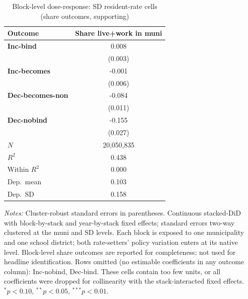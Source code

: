 \begin{table}[!htbp]
  \centering
  \caption{Block-level dose-response: SD resident-rate cells (share outcomes, supporting)}
  \label{tab:headline_block_sd_shares}
  \footnotesize
  \renewcommand{\arraystretch}{0.9}
  \begin{tabular}{lc}
    \toprule
    Outcome & Share live+work in muni \\
    \midrule
    \textbf{Inc-bind} & 0.008\sym{***} \\
                      & (0.003) \\
    \textbf{Inc-becomes} & -0.001 \\
                      & (0.006) \\
    \textbf{Dec-becomes-non} & -0.084\sym{***} \\
                      & (0.011) \\
    \textbf{Dec-nobind} & -0.155\sym{***} \\
                      & (0.027) \\
    \midrule
    $N$ & 20,050,835 \\
    $R^2$ & 0.438 \\
    Within $R^2$ & 0.000 \\
    Dep.\ mean & 0.103 \\
    Dep.\ SD & 0.158 \\
    \bottomrule
  \end{tabular}
  \vspace{0.3em}
  \begin{minipage}{0.95\textwidth}
    \footnotesize \textit{Notes:} Cluster-robust standard errors in parentheses. Continuous stacked-DiD with block-by-stack and year-by-stack fixed effects; standard errors two-way clustered at the muni and SD levels. Each block is exposed to one municipality and one school district; both rate-setters' policy variation enters at its native level. Block-level share outcomes are reported for completeness; not used for headline identification. Rows omitted (no estimable coefficients in any outcome column): Inc-nobind, Dec-bind. These cells contain too few units, or all coefficients were dropped for collinearity with the stack-interacted fixed effects. $^{*}p<0.10$, $^{**}p<0.05$, $^{***}p<0.01$.
  \end{minipage}
\end{table}
